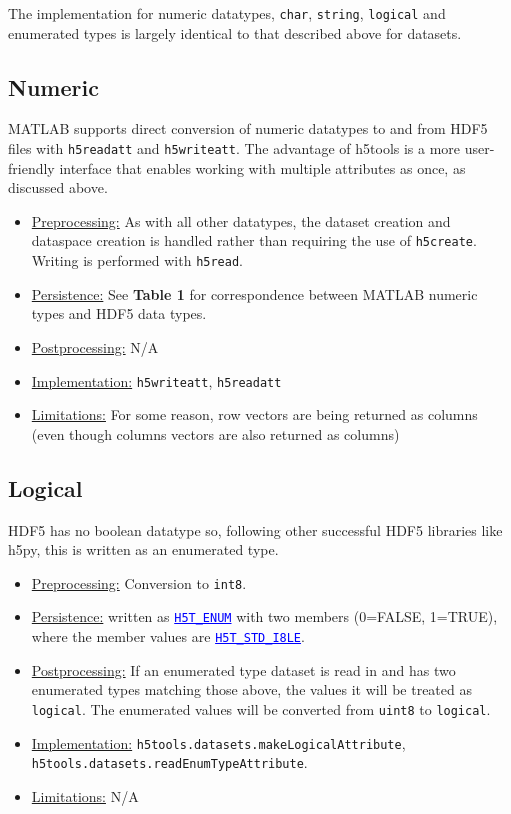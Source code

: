 \documentclass[11pt]{exam}
\newcommand\myurl[1]{\textcolor{blue}{\underline{#1}}}
\newcommand\myfcn[1]{\colorbox{codegray}{\textcolor{codeblue}{\texttt{#1}}}}
\newcommand\matfcn[1]{\textcolor{darkteal}{\texttt{#1}}}
\newcommand\hdftype[1]{\texttt{\myurl{#1}}}
\begin{document}
		\noindent The implementation for numeric datatypes, \texttt{char}, \texttt{string}, \texttt{logical} and enumerated types is largely identical to that described above for datasets. 
		

        \subsection{Numeric}
        \noindent MATLAB supports direct conversion of numeric datatypes to and from HDF5 files with \matfcn{h5readatt} and \matfcn{h5writeatt}. The advantage of h5tools is a more user-friendly interface that enables working with multiple attributes as once, as discussed above.
        \begin{itemize}
	        \item \underline{Preprocessing:} As with all other datatypes, the dataset creation and dataspace creation is handled rather than requiring the use of \matfcn{h5create}. Writing is performed with \matfcn{h5read}.
	        \item \underline{Persistence:} See \textbf{Table 1} for correspondence between MATLAB numeric types and HDF5 data types.
	        \item \underline{Postprocessing:} N/A
			\item \underline{Implementation:} \matfcn{h5writeatt}, \matfcn{h5readatt}
			\item \underline{Limitations:} For some reason, row vectors are being returned as columns (even though columns vectors are also returned as columns)
	    \end{itemize}

		\subsection{Logical}
		\noindent HDF5 has no boolean datatype so, following other successful HDF5 libraries like h5py, this is written as an enumerated type.
		\begin{itemize}
			\item \underline{Preprocessing:} Conversion to \texttt{int8}.
			\item \underline{Persistence:} written as \myurl{\texttt{H5T\_ENUM}} with two members (0=FALSE, 1=TRUE), where the member values are \hdftype{H5T\_STD\_I8LE}. 
			\item \underline{Postprocessing:} If an enumerated type dataset is read in and has two enumerated types matching those above, the values it will be treated as \texttt{logical}. The enumerated values will be converted from \texttt{uint8} to \texttt{logical}. 
			\item \underline{Implementation:} \myfcn{h5tools.datasets.makeLogicalAttribute},\\ \myfcn{h5tools.datasets.readEnumTypeAttribute}.
			\item \underline{Limitations:} N/A
		\end{itemize}
        
\end{document}
